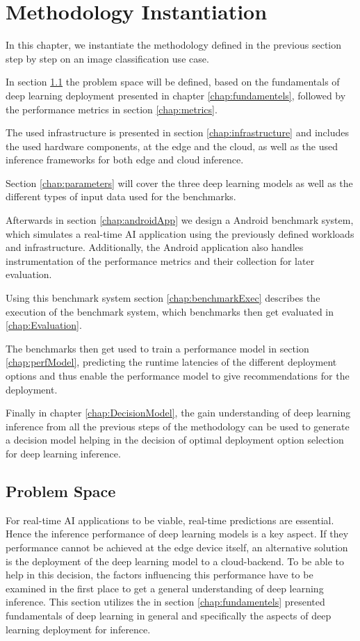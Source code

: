 \chapter{Methodology Instantiation}
\label{chap:experiments}
In this chapter, we instantiate the methodology defined in the previous section step by step on an image classification use case.

In section \ref{chap:problemSpace} the problem space will be defined, based on the fundamentals of deep learning deployment presented in chapter \ref{chap:fundamentels}, followed by the performance metrics in section \ref{chap:metrics}.


The used infrastructure is presented in section \ref{chap:infrastructure} and includes the used hardware components, at the edge and the cloud, as well as the used inference frameworks for both edge and cloud inference.

Section \ref{chap:parameters} will cover the three deep learning models as well as the different types of input data used for the benchmarks.

Afterwards in section \ref{chap:androidApp} we design a Android benchmark system, which simulates a real-time AI application using the previously defined workloads and infrastructure. Additionally, the Android application also handles instrumentation of the performance metrics and their collection for later evaluation.

Using this benchmark system section \ref{chap:benchmarkExec} describes the execution of the benchmark system, which benchmarks then get evaluated in \ref{chap:Evaluation}.

The benchmarks then get used to train a performance model in section \ref{chap:perfModel}, predicting the runtime latencies of the different deployment options and thus enable the performance model to give recommendations for the deployment.

Finally in chapter \ref{chap:DecisionModel}, the gain understanding of deep learning inference from all the previous steps of the methodology can be used to generate a decision model helping in the decision of optimal deployment option selection for deep learning inference.


\section{Problem Space}
\label{chap:problemSpace}
For real-time AI applications to be viable, real-time predictions are essential. Hence the inference performance of deep learning models is a key aspect.
If they performance cannot be achieved at the edge device itself, an alternative solution is the deployment of the deep learning model to a cloud-backend.
To be able to help in this decision, the factors influencing this performance have to be examined in the first place to get a general understanding of deep learning inference.
This section utilizes the in section \ref{chap:fundamentels} presented fundamentals of deep learning in general and specifically the aspects of deep learning deployment for inference.

